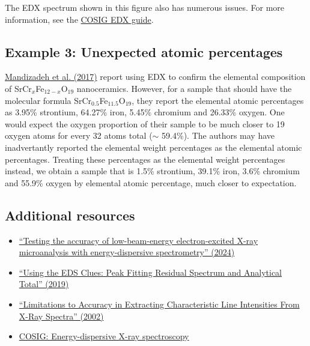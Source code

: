 \documentclass[letterpaper, 12pt]{article}
\begin{document}
The EDX spectrum shown in this figure also has numerous issues. For more information, see the \href{https://osf.io/shfjy}{COSIG EDX guide}.

\subsection*{Example 3: Unexpected atomic percentages}

\href{https://doi.org/10.1371/journal.pone.0162891}{Mandizadeh et al. (2017)} report using EDX to confirm the elemental composition of SrCr$_x$Fe$_{12-x}$O$_{19}$ nanoceramics. However, for a sample that should have the molecular formula SrCr$_{0.5}$Fe$_{11.5}$O$_{19}$, they report the elemental atomic percentages as 3.95\% strontium, 64.27\% iron, 5.45\% chromium and 26.33\% oxygen. One would expect the oxygen proportion of their sample to be much closer to 19 oxygen atoms for every 32 atoms total ($\sim$ 59.4\%). The authors may have inadvertantly reported the elemental weight percentages as the elemental atomic percentages. Treating these percentages as the elemental weight percentages instead, we obtain a sample that is 1.5\% strontium, 39.1\% iron, 3.6\% chromium and 55.9\% oxygen by elemental atomic percentage, much closer to expectation.

\subsection*{Additional resources}

\begin{itemize}
    \setlength\itemsep{-0.5em}
    \item \href{https://doi.org/10.1007/s10853-024-10285-4}{``Testing the accuracy of low-beam-energy electron-excited X-ray microanalysis with energy-dispersive spectrometry'' (2024)}
    \item \href{https://doi.org/10.1017/S1431927619002964}{``Using the EDS Clues: Peak Fitting Residual Spectrum and Analytical Total'' (2019)}
    \item \href{https://doi.org/10.6028/jres.107.045}{``Limitations to Accuracy in Extracting Characteristic Line Intensities From X-Ray Spectra'' (2002)}
    \item \href{https://osf.io/shfjy}{COSIG: Energy-dispersive X-ray spectroscopy}
\end{itemize}
\end{document}
